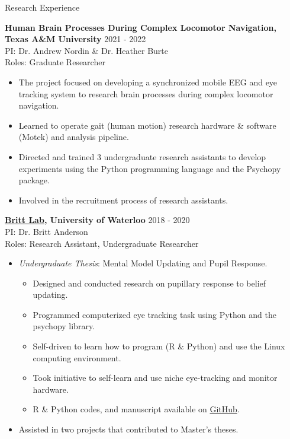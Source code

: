 \documentclass{resume} %
\begin{document}
\begin{rSection}{Research Experience}
\begin{itemize}[nosep]
    \end{itemize}

    {\bf {Human Brain Processes During Complex Locomotor Navigation},
        Texas A\&M University}
    \hfill {2021 - 2022}
    \\PI: Dr. Andrew Nordin \& Dr. Heather Burte
    \\Roles: Graduate Researcher
    
    \begin{itemize}[nosep]
        
        \item The project focused on developing a synchronized mobile EEG and eye tracking system to research brain processes during complex locomotor navigation.
        \item Learned to operate gait (human motion) research hardware \& software (Motek) and analysis pipeline.
        \item Directed and trained 3 undergraduate research assistants to 
        develop experiments using the Python programming language and the Psychopy package.
        \item Involved in the recruitment process of research assistants.
        
    \end{itemize}
    
    {\bf \href{https://brittlab.uwaterloo.ca/}{Britt Lab}, 
        University of Waterloo}
    \hfill {2018 - 2020}
    \\PI: Dr. Britt Anderson
    \\Roles: Research Assistant, Undergraduate Researcher
    
    \begin{itemize}[nosep]
        
        \item \emph{Undergraduate Thesis}: 
        Mental Model Updating and Pupil Response.
            \begin{itemize}
                \item Designed and conducted research on pupillary response to 
                belief updating.
                \item Programmed computerized eye tracking task using Python and the psychopy library.
                \item Self-driven to learn how to program (R \& Python) and use the Linux computing environment.
                \item Took initiative to self-learn and use niche eye-tracking and monitor hardware.
                \item R \& Python codes, and manuscript available on \href{https://github.com/sjp117/Undergrad_Projects/tree/master/mentalModelUpdatingPupil}{GitHub}.
            \end{itemize}
        \item Assisted in two projects that contributed to Master's theses.
        
    \end{itemize}
    
\end{rSection}
\end{document}
